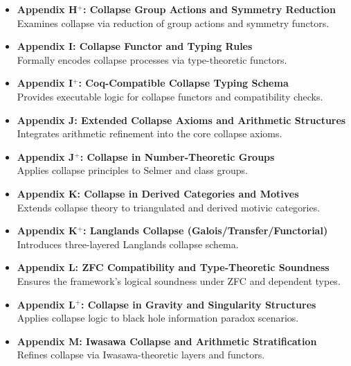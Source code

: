 \documentclass[11pt]{article}
\begin{document}
\begin{itemize}
  \item \textbf{Appendix H$^+$: Collapse Group Actions and Symmetry Reduction} \\
  Examines collapse via reduction of group actions and symmetry functors.

  \item \textbf{Appendix I: Collapse Functor and Typing Rules} \\
  Formally encodes collapse processes via type-theoretic functors.

  \item \textbf{Appendix I$^+$: Coq-Compatible Collapse Typing Schema} \\
  Provides executable logic for collapse functors and compatibility checks.

  \item \textbf{Appendix J: Extended Collapse Axioms and Arithmetic Structures} \\
  Integrates arithmetic refinement into the core collapse axioms.

  \item \textbf{Appendix J$^+$: Collapse in Number-Theoretic Groups} \\
  Applies collapse principles to Selmer and class groups.

  \item \textbf{Appendix K: Collapse in Derived Categories and Motives} \\
  Extends collapse theory to triangulated and derived motivic categories.

  \item \textbf{Appendix K$^+$: Langlands Collapse (Galois/Transfer/Functorial)} \\
  Introduces three-layered Langlands collapse schema.

  \item \textbf{Appendix L: ZFC Compatibility and Type-Theoretic Soundness} \\
  Ensures the framework's logical soundness under ZFC and dependent types.

  \item \textbf{Appendix L$^+$: Collapse in Gravity and Singularity Structures} \\
  Applies collapse logic to black hole information paradox scenarios.

  \item \textbf{Appendix M: Iwasawa Collapse and Arithmetic Stratification} \\
  Refines collapse via Iwasawa-theoretic layers and functors.


\end{itemize}
\end{document}
